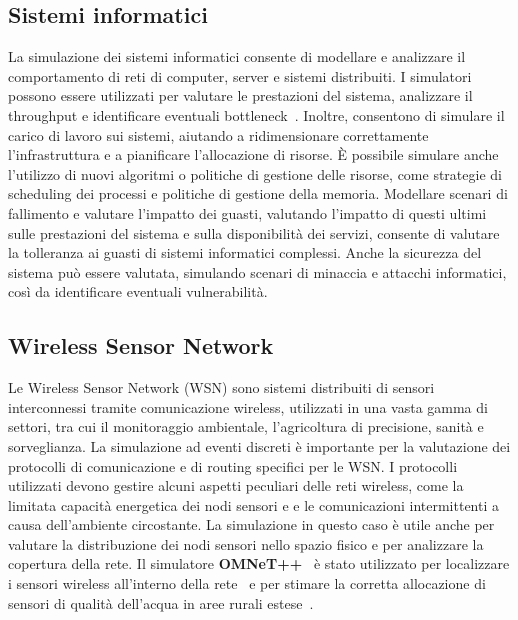 \documentclass[12pt,a4paper,openright,twoside]{book}
\begin{document}
\subsection{Sistemi informatici}
La simulazione dei sistemi informatici consente di modellare e analizzare il comportamento di reti di computer, server e sistemi distribuiti. 
I simulatori possono essere utilizzati per valutare le prestazioni del sistema, analizzare il throughput e identificare eventuali bottleneck~\cite{LEROUDIER197950}. Inoltre, consentono di simulare il carico di lavoro sui sistemi, aiutando a ridimensionare correttamente l'infrastruttura e a pianificare l'allocazione di risorse. 
È possibile simulare anche l'utilizzo di nuovi algoritmi o politiche di gestione delle risorse, come strategie di scheduling dei processi e politiche di gestione della memoria.
Modellare scenari di fallimento e valutare l'impatto dei guasti, valutando l'impatto di questi ultimi sulle prestazioni del sistema e sulla disponibilità dei servizi, consente di valutare la tolleranza ai guasti di sistemi informatici complessi. 
Anche la sicurezza del sistema può essere valutata, simulando scenari di minaccia e attacchi informatici, così da identificare eventuali vulnerabilità.

\subsection{Wireless Sensor Network}
Le Wireless Sensor Network (WSN) sono sistemi distribuiti di sensori interconnessi tramite comunicazione wireless, utilizzati in una vasta gamma di settori, tra cui il monitoraggio ambientale, l'agricoltura di precisione, sanità e sorveglianza. 
La simulazione ad eventi discreti è importante per la valutazione dei protocolli di comunicazione e di routing specifici per le WSN. I protocolli utilizzati devono gestire alcuni aspetti peculiari delle reti wireless, come la limitata capacità energetica dei nodi sensori e e le comunicazioni intermittenti a causa dell'ambiente circostante. 
La simulazione in questo caso è utile anche per valutare la distribuzione dei nodi sensori nello spazio fisico e per analizzare la copertura della rete. Il simulatore \textbf{OMNeT++}~\cite{10.5555/1416222.1416290} è stato utilizzato per localizzare i sensori wireless all'interno della rete~\cite{1656681} e per stimare la corretta allocazione di sensori di qualità dell'acqua in aree rurali estese~\cite{9476333}. 
\end{document}
